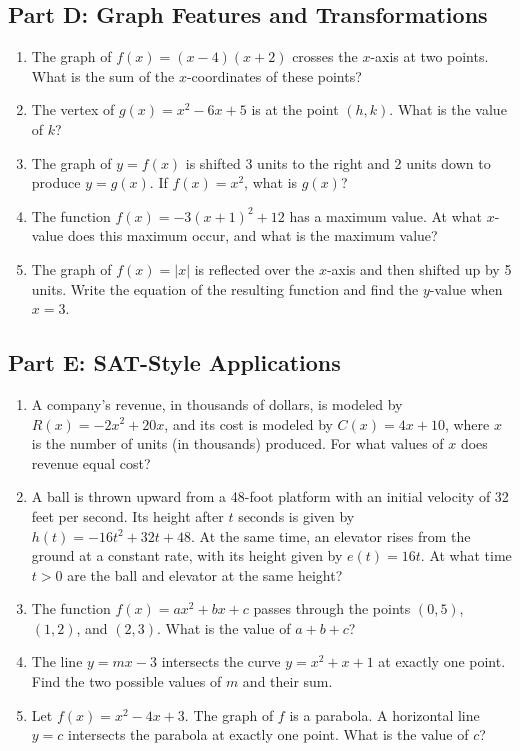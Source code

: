 \documentclass[14pt]{extarticle}
\begin{document}
\subsection*{Part D: Graph Features and Transformations}
\begin{enumerate}
  \item The graph of \(f(x) = (x - 4)(x + 2)\) crosses the \(x\)-axis at two points. What is the sum of the \(x\)-coordinates of these points?
  \item The vertex of \(g(x) = x^2 - 6x + 5\) is at the point \((h, k)\). What is the value of \(k\)?
  \item The graph of \(y = f(x)\) is shifted 3 units to the right and 2 units down to produce \(y = g(x)\). If \(f(x) = x^2\), what is \(g(x)\)?
  \item The function \(f(x) = -3(x + 1)^2 + 12\) has a maximum value. At what \(x\)-value does this maximum occur, and what is the maximum value?
  \item The graph of \(f(x) = |x|\) is reflected over the \(x\)-axis and then shifted up by 5 units. Write the equation of the resulting function and find the \(y\)-value when \(x = 3\).
\end{enumerate}

\subsection*{Part E: SAT-Style Applications}
\begin{enumerate}
  \item A company's revenue, in thousands of dollars, is modeled by \(R(x) = -2x^2 + 20x\), and its cost is modeled by \(C(x) = 4x + 10\), where \(x\) is the number of units (in thousands) produced. For what values of \(x\) does revenue equal cost?
  \item A ball is thrown upward from a 48-foot platform with an initial velocity of 32 feet per second. Its height after \(t\) seconds is given by \(h(t) = -16t^2 + 32t + 48\). At the same time, an elevator rises from the ground at a constant rate, with its height given by \(e(t) = 16t\). At what time \(t > 0\) are the ball and elevator at the same height?
  \item The function \(f(x) = ax^2 + bx + c\) passes through the points \((0, 5)\), \((1, 2)\), and \((2, 3)\). What is the value of \(a + b + c\)?
  \item The line \(y = mx - 3\) intersects the curve \(y = x^2 + x + 1\) at exactly one point. Find the two possible values of \(m\) and their sum.
  \item Let \(f(x) = x^2 - 4x + 3\). The graph of \(f\) is a parabola. A horizontal line \(y = c\) intersects the parabola at exactly one point. What is the value of \(c\)?
\end{enumerate}
\end{document}

